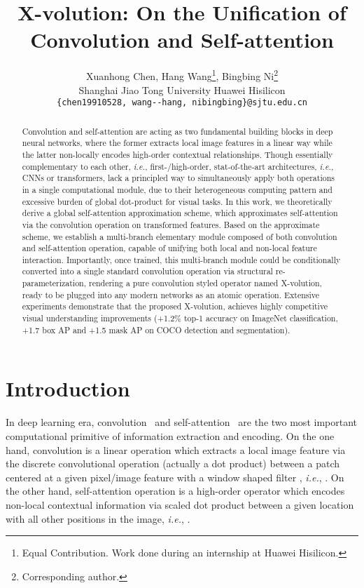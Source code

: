 \documentclass{article}
\title{X-volution: On the Unification of Convolution and Self-attention}
\author{Xuanhong Chen\footnotemark[1], \enskip Hang Wang\thanks{Equal Contribution. Work done during an internship at Huawei Hisilicon.}, \enskip Bingbing Ni\thanks{Corresponding author.}\\
Shanghai Jiao Tong University \quad   Huawei Hisilicon\\
\texttt{\{chen19910528, wang-\!-hang, nibingbing\}@sjtu.edu.cn}
}
\begin{document}
\maketitle

\begin{abstract}
Convolution and self-attention are acting as two fundamental building blocks in deep neural networks, where the former extracts local image features in a linear way while the latter non-locally encodes high-order contextual relationships.
Though essentially complementary to each other, \emph{i.e.}, first-/high-order, stat-of-the-art architectures, \emph{i.e.}, CNNs or transformers, lack a principled way to simultaneously apply both operations in a single computational module, due to their heterogeneous computing pattern and excessive burden of global dot-product for visual tasks.
In this work, we theoretically derive a global self-attention approximation scheme, which approximates self-attention via the convolution operation on transformed features.
Based on the approximate scheme, we establish a multi-branch elementary module composed of both convolution and self-attention operation, capable of unifying both local and non-local feature interaction.
Importantly, once trained, this multi-branch module could be conditionally converted into a single standard convolution operation via structural re-parameterization, rendering a pure convolution styled operator named X-volution, ready to be plugged into any modern networks as an atomic operation.
Extensive experiments demonstrate that the proposed X-volution, achieves highly competitive visual understanding improvements (+1.2\% top-1 accuracy on ImageNet classification, +1.7 box AP and +1.5 mask AP on COCO detection and segmentation). 
\end{abstract}

\section{Introduction}

In deep learning era, convolution~\cite{726791,DBLP:conf/nips/KrizhevskySH12} and self-attention~\cite{DBLP:conf/nips/VaswaniSPUJGKP17} are the two most important computational primitive of information extraction and encoding.
On the one hand, convolution is a linear operation which extracts a local image feature via the discrete convolutional operation (actually a dot product) between a patch  centered at a given pixel/image feature with a window shaped filter 
{\small{}}, \emph{i.e.}, {\small{}}.
On the other hand, self-attention operation is a high-order operator which encodes non-local contextual information via scaled dot product between a given location with all other positions in the image, \emph{i.e.}, {\small{}}.
\end{document}
